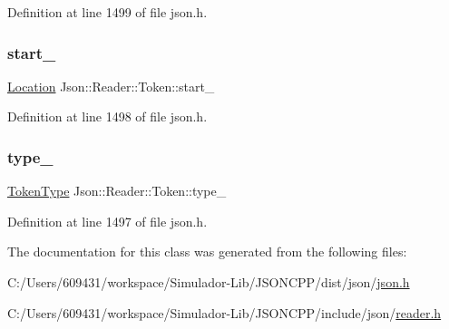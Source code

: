 Definition at line 1499 of file json.\+h.

\hypertarget{class_json_1_1_reader_1_1_token_aff87d677b9ac4b52542a00b0d6673249}{}\label{class_json_1_1_reader_1_1_token_aff87d677b9ac4b52542a00b0d6673249} 
\subsubsection{\texorpdfstring{start\+\_\+}{start\_}}
{\footnotesize\ttfamily \hyperlink{class_json_1_1_reader_a46795b5b272bf79a7730e406cb96375a}{Location} Json\+::\+Reader\+::\+Token\+::start\+\_\+}



Definition at line 1498 of file json.\+h.

\hypertarget{class_json_1_1_reader_1_1_token_aa0f06d0105ec3d8cb42427c66b991bad}{}\label{class_json_1_1_reader_1_1_token_aa0f06d0105ec3d8cb42427c66b991bad} 
\subsubsection{\texorpdfstring{type\+\_\+}{type\_}}
{\footnotesize\ttfamily \hyperlink{class_json_1_1_reader_aa35e6ab574dc399a0a645ad98ed66bc9}{Token\+Type} Json\+::\+Reader\+::\+Token\+::type\+\_\+}



Definition at line 1497 of file json.\+h.



The documentation for this class was generated from the following files\+:\begin{DoxyCompactItemize}
\item 
C\+:/\+Users/609431/workspace/\+Simulador-\/\+Lib/\+J\+S\+O\+N\+C\+P\+P/dist/json/\hyperlink{dist_2json_2json_8h}{json.\+h}\item 
C\+:/\+Users/609431/workspace/\+Simulador-\/\+Lib/\+J\+S\+O\+N\+C\+P\+P/include/json/\hyperlink{reader_8h}{reader.\+h}\end{DoxyCompactItemize}
